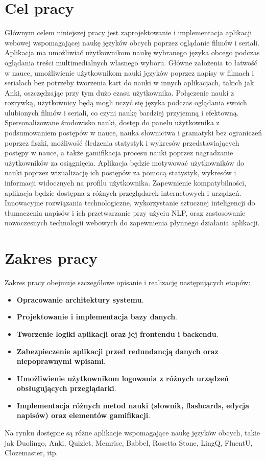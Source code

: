 \section{Cel pracy}
Głównym celem niniejszej pracy jest zaprojektowanie i implementacja aplikacji webowej wspomagającej naukę języków obcych poprzez oglądanie filmów i seriali. Aplikacja ma umożliwiać użytkownikom naukę wybranego języka obcego podczas oglądania treści multimedialnych własnego wyboru. Główne założenia to łatwość w nauce, umożliwienie użytkownikom nauki języków poprzez napisy w filmach i serialach bez potrzeby tworzenia kart do nauki w innych aplikacjach, takich jak Anki, oszczędzając przy tym dużo czasu użytkownika. Połączenie nauki z rozrywką, użytkownicy będą mogli uczyć się języka podczas oglądania swoich ulubionych filmów i seriali, co czyni naukę bardziej przyjemną i efektowną. Spersonalizowane środowisko nauki, dostęp do panelu użytkownika z podsumowaniem postępów w nauce, nauka słownictwa i gramatyki bez ograniczeń poprzez fiszki, możliwość śledzenia statystyk i wykresów przedstawiających postępy w nauce, a także gamifikacja procesu nauki poprzez nagradzanie użytkowników za osiągnięcia. Aplikacja będzie motywować użytkowników do nauki poprzez wizualizację ich postępów za pomocą statystyk, wykresów i informacji widocznych na profilu użytkownika. Zapewnienie kompatybilności, aplikacja będzie dostępna z różnych przeglądarek internetowych i urządzeń. Innowacyjne rozwiązania technologiczne, wykorzystanie sztucznej inteligencji do tłumaczenia napisów i ich przetwarzanie przy użyciu NLP, oraz zastosowanie nowoczesnych technologii webowych do zapewnienia płynnego działania aplikacji.

\section{Zakres pracy}
Zakres pracy obejmuje szczegółowe opisanie i realizację następujących etapów:

\begin{itemize}
      \item \textbf{Opracowanie architektury systemu}.
      \item \textbf{Projektowanie i implementacja bazy danych}.
      \item \textbf{Tworzenie logiki aplikacji oraz jej frontendu i backendu}.
      \item \textbf{Zabezpieczenie aplikacji przed redundancją danych oraz niepoprawnymi wpisami}.
      \item \textbf{Umożliwienie użytkownikom logowania z różnych urządzeń obsługujących przeglądarki}.
      \item \textbf{Implementacja różnych metod nauki (słownik, flashcards, edycja napisów) oraz elementów gamifikacji}.
\end{itemize}
Na rynku dostępne są różne aplikacje wspomagające naukę języków obcych, takie jak Duolingo, Anki, Quizlet, Memrise, Babbel, Rosetta Stone, LingQ, FluentU, Clozemaster, itp.
